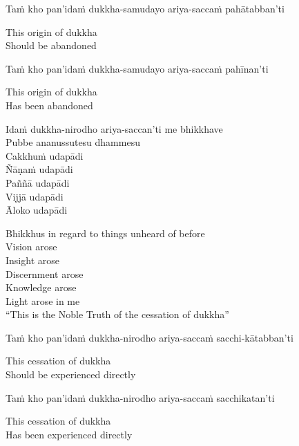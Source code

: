 Taṁ kho pan'idaṁ dukkha-samudayo ariya-saccaṁ pahātabban'ti

\begin{english}
  This origin of dukkha\\
  Should be abandoned
\end{english}

Taṁ kho pan'idaṁ dukkha-samudayo ariya-saccaṁ pahīnan'ti

\ifbfiveversion\clearpage\fi

\begin{english}
  This origin of dukkha\\
  Has been abandoned
\end{english}

Idaṁ dukkha-nirodho ariya-saccan'ti me bhikkhave\\
Pubbe ananussutesu dhammesu\\
Cakkhuṁ udapādi\\
Ñāṇaṁ udapādi\\
Paññā udapādi\\
Vijjā udapādi\\
Āloko udapādi

\begin{english-verses}
  Bhikkhus in regard to things unheard of before\\
  Vision arose\\
  Insight arose\\
  Discernment arose\\
  Knowledge arose\\
  Light arose in me\\
  ``This is the Noble Truth of the cessation of dukkha''
\end{english-verses}

Taṁ kho pan'idaṁ dukkha-nirodho ariya-saccaṁ sacchi-kātabban'ti

\begin{english}
  This cessation of dukkha\\
  Should be experienced directly
\end{english}

\begin{pali-hang}
  Taṁ kho pan'idaṁ dukkha-nirodho ariya-saccaṁ sacchikatan'ti
\end{pali-hang}

\begin{english}
  This cessation of dukkha\\
  Has been experienced directly
\end{english}

